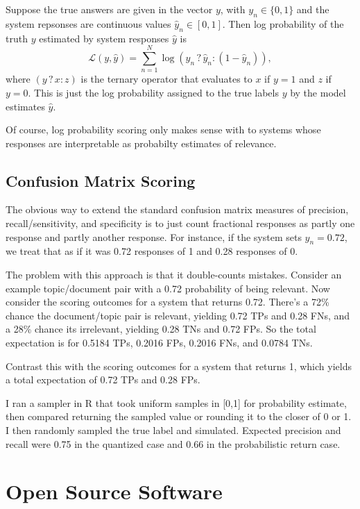 \documentclass{article}
\begin{document}
Suppose the true answers are given in the vector
$y$, with $y_n \in \{ 0, 1 \}$ and the system repsonses are continuous
values $\hat{y}_n \in [0,1]$.  Then log probability of the truth 
$y$ estimated by system responses $\hat{y}$ is
%
\[
{\mathcal L}(y,\hat{y})  = \sum_{n=1}^N \log (y_n \, ? \, \hat{y}_n : (1 - \hat{y}_n)),
\]
%
where $(y \, ? \, x : z)$ is the ternary operator that evaluates to $x$ if $y
= 1$ and $z$ if $y = 0$.  This is just the log probability assigned to
the true labels $y$ by the model estimates $\hat{y}$.

Of course, log probability scoring only makes sense with to
systems whose responses are interpretable as probabilty estimates of
relevance.


\subsection{Confusion Matrix Scoring}\label{confusion-matrix-eval-sec}

The obvious way to extend the standard confusion matrix measures
of precision, recall/sensitivity, and specificity is to just count
fractional responses as partly one response and partly another
response.  For instance, if the system sets $\hat{y}_n = 0.72$,
we treat that as if it was 0.72 responses of 1 and 0.28 responses
of 0. 

The problem with this approach is that it double-counts mistakes.
Consider an example topic/document pair with a 0.72 probability of
being relevant.  Now consider the scoring outcomes for a system that
returns 0.72.  There's a 72\% chance the document/topic pair is
relevant, yielding 0.72 TPs and 0.28 FNs, and a 28\% chance its
irrelevant, yielding 0.28 TNs and 0.72 FPs.  So the total
expectation is for 0.5184 TPs, 0.2016 FPs, 0.2016 FNs, and 
0.0784 TNs.  

Contrast this with the scoring outcomes for a system that returns 1,
which yields a total expectation of 0.72 TPs and 0.28 FPs.

I ran a sampler in R that took uniform samples in [0,1] for
probability estimate, then compared returning the sampled value
or rounding it to the closer of 0 or 1.  I then randomly sampled
the true label and simulated.  Expected precision and recall were
0.75 in the quantized case and 0.66 in the probabilistic return case.


\section{Open Source Software}
\end{document}
